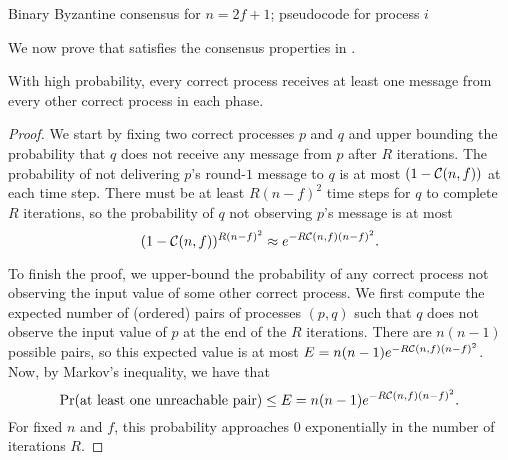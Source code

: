 \begin{algorithm}
\caption{Binary Byzantine consensus for $n = 2f+1$; pseudocode for process $i$}
\label{alg:resilient-consensus}
\end{algorithm}

We now prove that  satisfies the consensus properties in .

\begin{lemma}\label{lem:all-hear}
    With high probability, every correct process receives at least one message from every other correct process in each phase.
\end{lemma}
\begin{proof}
We start by fixing two correct processes $p$ and $q$ and upper bounding the probability that $q$ does not receive any message from $p$ after $R$ iterations. The probability of not delivering $p$'s round-$1$ message to $q$ is at most $(1-\mathcal{C}(n,f))$ at each time step. There must be at least $R(n-f)^2$ time steps for $q$ to complete $R$ iterations, so the probability of $q$ not observing $p$'s message is at most $$(1-\mathcal{C}(n,f))^{R(n-f)^2} \approx e^{-R\mathcal{C}(n,f)(n-f)^2}.$$

To finish the proof, we upper-bound the probability of any correct process not observing the input value of some other correct process. We first compute the expected number of (ordered) pairs of processes $(p,q)$ such that $q$ does not observe the input value of $p$ at the end of the $R$ iterations. There are $n(n-1)$ possible pairs, so this expected value is at most $E = n(n-1)e^{-R\mathcal{C}(n,f)(n-f)^2}$. Now, by Markov's inequality, we have that 
$$\Pr(\text{at least one unreachable pair}) \leq E = n(n-1)e^{-R\mathcal{C}(n,f)(n-f)^2}.$$
For fixed $n$ and $f$, this probability approaches $0$ exponentially in the number of iterations $R$.
\end{proof}

